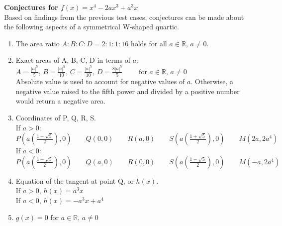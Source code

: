 \documentclass{homework}
\begin{document}
\begin{flushleft}
    \textbf{Conjectures for $f(x)=x^4-2ax^3+a^3x$} \\ \vspace{1em}
    Based on findings from the previous test cases, conjectures can be made about the following aspects of a symmetrical W-shaped quartic.
    \\ \vspace{1em}
    \begin{enumerate}
        \item The area ratio $A:B:C:D=2:1:1:16$ holds for all $ a\in \mathbb{R}$, $a\neq 0$. \\ \vspace{1em}
        \item Exact areas of A, B, C, D in terms of $a$: \vspace{0.8em} \\
        $A=\frac{|a|^5}{5}$, $B=\frac{|a|^5}{10}$, $C=\frac{|a|^5}{10}$, $D=\frac{8|a|^5}{5} \hspace{2em}\text{ for } a\in \mathbb{R},\, a\neq0$ \vspace{0.5em} \\ 
        Absolute value is used to account for negative values of $a$. Otherwise, a negative value raised to the fifth power and divided by a positive number would return a negative area. \vspace{0.9em} \\
        \item Coordinates of P, Q, R, S. \\
        If $a>0$: 
        $P(a(\frac{1-\sqrt{5}}{2}),0) \hspace{2em} Q(0,0) \hspace{2em} R(a,0) \hspace{2em} S(a(\frac{1+\sqrt{5}}{2}),0) \hspace{2em} M(2a,2a^4)$ \vspace{0.9em}\\
        If $a<0$: 
        $P(a(\frac{1+\sqrt{5}}{2}),0) \hspace{2em} Q(a,0) \hspace{2em} R(0,0) \hspace{2em} S(a(\frac{1-\sqrt{5}}{2}),0) \hspace{2em} M(-a,2a^4)$ \vspace{1.9em}\\ 
        \item Equation of the tangent at point Q, or $h(x)$. \vspace{0.4em} \\
        If $a>0$, $h(x)=a^3x$ \vspace{0.4em} \\
        If $a<0$, $h(x)=-a^3x+a^4$\vspace{0.8em} \\
        \item $g(x)=0$ for $a\in \mathbb{R},\, a\neq0$ \vspace{1.1em}
    \end{enumerate}
    \vspace{1.2em}
\end{flushleft}
\end{document}
